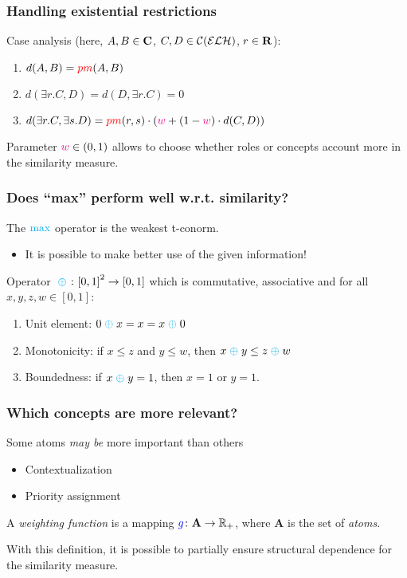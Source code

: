 \documentclass[smaller]{beamer}
\begin{document}
\begin{frame}
  \frametitle{Handling existential restrictions}
  Case analysis (here, \(A,B \in \mathbf{C}\),
  \(C,D \in \mathcal{C}(\mathcal{ELH})\),
  \(r \in \mathbf{R}\)):
  \begin{enumerate}[<+->]
    \item \(d(A,B) = \textcolor{red}{pm}(A,B)\)
    \item \(d(\exists{}r.C,D) = d(D,\exists{}r.C) = 0\)
    \item \(d(\exists{}r.C,\exists{}s.D) =
    \textcolor{red}{pm}(r,s) \cdot \left(\textcolor{magenta}{w} + (1-\textcolor{magenta}{w}) \cdot d(C,D)\right)\)
  \end{enumerate}

  Parameter \(\textcolor{magenta}{w} \in (0,1)\) allows
  to choose whether roles or concepts account more
  in the similarity measure.
\end{frame}

\begin{frame}
  \frametitle{Does ``max'' perform well w.r.t. similarity?}
  The \(\textcolor{cyan}{\max}\) operator is the weakest \alert{t-conorm}.
  \begin{itemize}
    \item It is possible to make better use of
          the given information!
  \end{itemize}
  \pause
  \begin{definition}
    Operator \(\;\textcolor{cyan}{\oplus}\; \colon {[0,1]}^2 \to [0,1]\) which is
    commutative, associative and for all
    \(x, y, z, w \in [0,1]\):
    \begin{enumerate}[<+->]
      \item \alert{Unit element}: \(0 \;\textcolor{cyan}{\oplus}\; x = x = x \;\textcolor{cyan}{\oplus}\; 0\)
      \item \alert{Monotonicity}: if \(x \le z\) and \(y \le w\), then \(x \;\textcolor{cyan}{\oplus}\; y \le z \;\textcolor{cyan}{\oplus}\; w\)
      \item \alert{Boundedness}: if \(x \;\textcolor{cyan}{\oplus}\; y = 1\), then \(x = 1\) or \(y = 1\).
    \end{enumerate}
  \end{definition}
\end{frame}

\begin{frame}
  \frametitle{Which concepts are more relevant?}
  Some atoms \textit{may be} more important than others
  \begin{itemize}
    \item Contextualization
    \item Priority assignment
  \end{itemize}
  \begin{definition}
    A \emph{weighting function} is a mapping 
    \(\textcolor{blue}{g} \colon \mathbf{A} \to \mathbb{R}_+\),
     where \(\mathbf{A}\) is the set of \emph{atoms}.
  \end{definition}
  With this definition, it is possible to partially
  ensure structural dependence for the similarity
  measure.
\end{frame}
\end{document}
